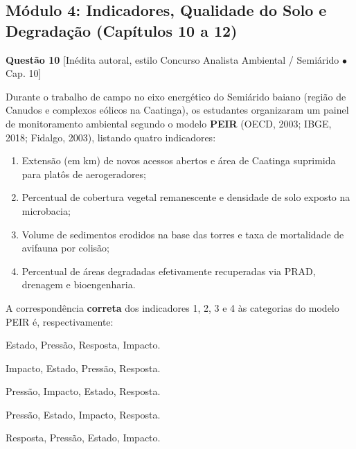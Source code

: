 \subsection*{Módulo 4: Indicadores, Qualidade do Solo e Degradação (Capítulos 10 a 12)}

\noindent\textbf{Questão 10} {\footnotesize\color{uefsMuted}[Inédita autoral, estilo Concurso Analista Ambiental / Semiárido $\bullet$ Cap. 10]}\par
Durante o trabalho de campo no eixo energético do Semiárido baiano (região de Canudos e complexos eólicos na Caatinga), os estudantes organizaram um painel de monitoramento ambiental segundo o modelo \textbf{PEIR} (OECD, 2003; IBGE, 2018; Fidalgo, 2003), listando quatro indicadores:
\begin{enumerate}[label=\arabic*., leftmargin=2.0em, itemsep=1.5pt, topsep=3pt]
  \item Extensão (em $\text{km}$) de novos acessos abertos e área de Caatinga suprimida para platôs de aerogeradores;
  \item Percentual de cobertura vegetal remanescente e densidade de solo exposto na microbacia;
  \item Volume de sedimentos erodidos na base das torres e taxa de mortalidade de avifauna por colisão;
  \item Percentual de áreas degradadas efetivamente recuperadas via PRAD, drenagem e bioengenharia.
\end{enumerate}
A correspondência \textbf{correta} dos indicadores 1, 2, 3 e 4 às categorias do modelo PEIR é, respectivamente:
\begin{alternativas}
  \item Estado, Pressão, Resposta, Impacto.
  \item Impacto, Estado, Pressão, Resposta.
  \item Pressão, Impacto, Estado, Resposta.
  \item Pressão, Estado, Impacto, Resposta.
  \item Resposta, Pressão, Estado, Impacto.
\end{alternativas}

